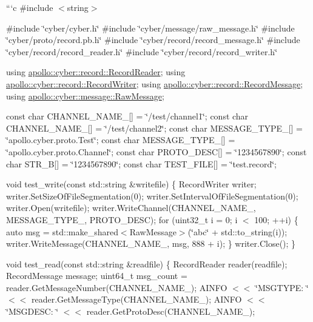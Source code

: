 {\ttfamily ```c \#include $<$string$>$}

{\ttfamily \#include \char`\"{}cyber/cyber.\-h\char`\"{} \#include \char`\"{}cyber/message/raw\-\_\-message.\-h\char`\"{} \#include \char`\"{}cyber/proto/record.\-pb.\-h\char`\"{} \#include \char`\"{}cyber/record/record\-\_\-message.\-h\char`\"{} \#include \char`\"{}cyber/record/record\-\_\-reader.\-h\char`\"{} \#include \char`\"{}cyber/record/record\-\_\-writer.\-h\char`\"{}}

{\ttfamily using \hyperlink{classapollo_1_1cyber_1_1record_1_1RecordReader}{apollo\-::cyber\-::record\-::\-Record\-Reader}; using \hyperlink{classapollo_1_1cyber_1_1record_1_1RecordWriter}{apollo\-::cyber\-::record\-::\-Record\-Writer}; using \hyperlink{structapollo_1_1cyber_1_1record_1_1RecordMessage}{apollo\-::cyber\-::record\-::\-Record\-Message}; using \hyperlink{structapollo_1_1cyber_1_1message_1_1RawMessage}{apollo\-::cyber\-::message\-::\-Raw\-Message};}

{\ttfamily const char C\-H\-A\-N\-N\-E\-L\-\_\-\-N\-A\-M\-E\-\_\mbox{[}\mbox{]} = \char`\"{}/test/channel1\char`\"{}; const char C\-H\-A\-N\-N\-E\-L\-\_\-\-N\-A\-M\-E\-\_\mbox{[}\mbox{]} = \char`\"{}/test/channel2\char`\"{}; const char M\-E\-S\-S\-A\-G\-E\-\_\-\-T\-Y\-P\-E\-\_\mbox{[}\mbox{]} = \char`\"{}apollo.\-cyber.\-proto.\-Test\char`\"{}; const char M\-E\-S\-S\-A\-G\-E\-\_\-\-T\-Y\-P\-E\-\_\mbox{[}\mbox{]} = \char`\"{}apollo.\-cyber.\-proto.\-Channel\char`\"{}; const char P\-R\-O\-T\-O\-\_\-\-D\-E\-S\-C\mbox{[}\mbox{]} = \char`\"{}1234567890\char`\"{}; const char S\-T\-R\-\_\-B\mbox{[}\mbox{]} = \char`\"{}1234567890\char`\"{}; const char T\-E\-S\-T\-\_\-\-F\-I\-L\-E\mbox{[}\mbox{]} = \char`\"{}test.\-record\char`\"{};}

{\ttfamily void test\-\_\-write(const std\-::string \&writefile) \{ Record\-Writer writer; writer.\-Set\-Size\-Of\-File\-Segmentation(0); writer.\-Set\-Interval\-Of\-File\-Segmentation(0); writer.\-Open(writefile); writer.\-Write\-Channel(\-C\-H\-A\-N\-N\-E\-L\-\_\-\-N\-A\-M\-E\-\_, M\-E\-S\-S\-A\-G\-E\-\_\-\-T\-Y\-P\-E\-\_, P\-R\-O\-T\-O\-\_\-\-D\-E\-S\-C); for (uint32\-\_\-t i = 0; i $<$ 100; ++i) \{ auto msg = std\-::make\-\_\-shared$<$\-Raw\-Message$>$(\char`\"{}abc\char`\"{} + std\-::to\-\_\-string(i)); writer.\-Write\-Message(C\-H\-A\-N\-N\-E\-L\-\_\-\-N\-A\-M\-E\-\_, msg, 888 + i); \} writer.\-Close(); \}}

{\ttfamily void test\-\_\-read(const std\-::string \&readfile) \{ Record\-Reader reader(readfile); Record\-Message message; uint64\-\_\-t msg\-\_\-count = reader.\-Get\-Message\-Number(\-C\-H\-A\-N\-N\-E\-L\-\_\-\-N\-A\-M\-E\-\_); A\-I\-N\-F\-O $<$$<$ \char`\"{}\-M\-S\-G\-T\-Y\-P\-E\-: \char`\"{} $<$$<$ reader.\-Get\-Message\-Type(\-C\-H\-A\-N\-N\-E\-L\-\_\-\-N\-A\-M\-E\-\_); A\-I\-N\-F\-O $<$$<$ \char`\"{}\-M\-S\-G\-D\-E\-S\-C\-: \char`\"{} $<$$<$ reader.\-Get\-Proto\-Desc(\-C\-H\-A\-N\-N\-E\-L\-\_\-\-N\-A\-M\-E\-\_);}

